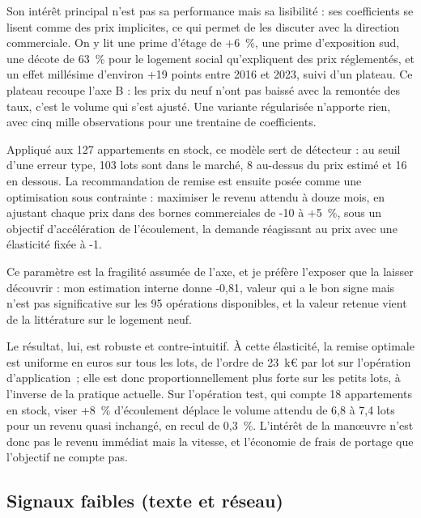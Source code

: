 Son intérêt principal n'est pas sa performance mais sa lisibilité : ses coefficients se lisent
comme des prix implicites, ce qui permet de les discuter avec la direction commerciale. On y
lit une prime d'étage de +6~\%, une prime d'exposition sud, une décote de 63~\% pour le logement
social qu'expliquent des prix réglementés, et un effet millésime d'environ +19 points entre
2016 et 2023, suivi d'un plateau. Ce plateau recoupe l'axe B : les prix du neuf n'ont pas
baissé avec la remontée des taux, c'est le volume qui s'est ajusté. Une variante régularisée
n'apporte rien, avec cinq mille observations pour une trentaine de coefficients.

Appliqué aux 127 appartements en stock, ce modèle sert de détecteur : au seuil d'une erreur
type, 103 lots sont dans le marché, 8 au-dessus du prix estimé et 16 en dessous. La
recommandation de remise est ensuite posée comme une optimisation sous contrainte : maximiser
le revenu attendu à douze mois, en ajustant chaque prix dans des bornes commerciales de -10 à
+5~\%, sous un objectif d'accélération de l'écoulement, la demande réagissant au prix avec une
élasticité fixée à -1.

Ce paramètre est la fragilité assumée de l'axe, et je préfère l'exposer que la laisser
découvrir : mon estimation interne donne -0,81, valeur qui a le bon signe mais n'est pas
significative sur les 95 opérations disponibles, et la valeur retenue vient de la littérature
sur le logement neuf.

Le résultat, lui, est robuste et contre-intuitif. À cette élasticité, la remise optimale est
uniforme en euros sur tous les lots, de l'ordre de 23~k€ par lot sur l'opération
d'application~; elle est donc proportionnellement plus forte sur les petits lots, à l'inverse
de la pratique actuelle. Sur l'opération test, qui compte 18 appartements en stock, viser
+8~\% d'écoulement déplace le volume attendu de 6,8 à 7,4 lots pour un revenu quasi inchangé,
en recul de 0,3~\%. L'intérêt de la manœuvre n'est donc pas le revenu immédiat mais la vitesse,
et l'économie de frais de portage que l'objectif ne compte pas.

\hypertarget{signaux-faibles-texte-et-ruxe9seau}{%
\subsection{Signaux faibles (texte et réseau)}\label{signaux-faibles-texte-et-ruxe9seau}}

